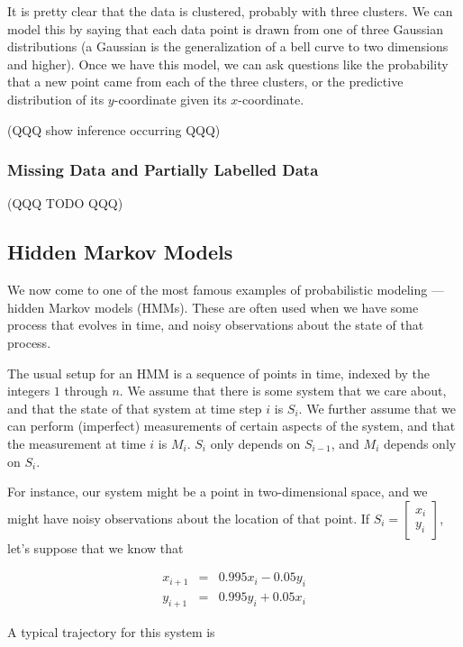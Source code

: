 \documentclass[11pt]{article}
\begin{document}
It is pretty clear that the data is clustered, probably with three clusters. We can model this by saying that each data point is drawn from one of three Gaussian distributions (a Gaussian is the generalization of a bell curve to two dimensions and higher). Once we have this model, we can ask questions like the probability that a new point came from each of the three clusters, or the predictive distribution of its $y$-coordinate given its $x$-coordinate.

(QQQ show inference occurring QQQ)

\subsubsection{Missing Data and Partially Labelled Data}

(QQQ TODO QQQ)

\subsection{Hidden Markov Models}

We now come to one of the most famous examples of probabilistic modeling --- hidden Markov models (HMMs). These are often used when we have some process that evolves in time, and noisy observations about the state of that process.

The usual setup for an HMM is a sequence of points in time, indexed by the integers $1$ through $n$. We assume that there is some system that we care about, and that the state of that system at time step $i$ is $S_i$. We further assume that we can perform (imperfect) measurements of certain aspects of the system, and that the measurement at time $i$ is $M_i$. $S_i$ only depends on $S_{i-1}$, and $M_i$ depends only on $S_i$.

For instance, our system might be a point in two-dimensional space, and we might have noisy observations about the location of that point. If $S_i = \left[ \begin{array}{c} x_i \\ y_i \end{array} \right]$, let's suppose that we know that

\begin{eqnarray*}
x_{i+1} & = & 0.995 x_{i} - 0.05 y_{i} \\
y_{i+1} & = & 0.995 y_{i} + 0.05 x_{i}
\end{eqnarray*}

A typical trajectory for this system is
\end{document}
